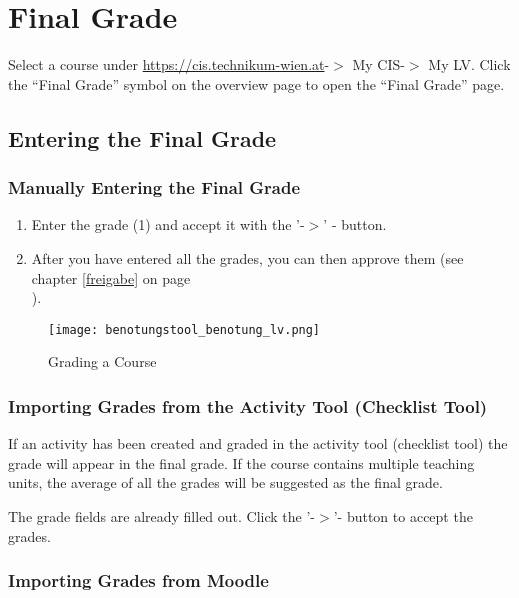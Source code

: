 \section{Final Grade}
\label{gesamtnote}
Select a course under \url{https://cis.technikum-wien.at}-$>$ My CIS-$>$ My LV. Click the "`Final Grade"' symbol on the overview page to open the "`Final Grade"' page.

\subsection{Entering the Final Grade}
\subsubsection{Manually Entering the Final Grade }
\label{ben}

\begin{enumerate}
\item Enter the grade (1) and accept it with the '-$>$' - button.
\item After you have entered all the grades, you can then approve them (see chapter \ref{freigabe} on page \pageref{freigabe}\\).
\end{enumerate}

\begin{figure}[ht]
\begin{center}
\texttt{[image: benotungstool\_benotung\_lv.png]}
\end{center}
\caption{Grading a Course}\label{benotung_lv}
\end{figure}

\subsubsection{Importing Grades from the Activity Tool (Checklist Tool)}
\label{ben}

If an activity has been created and graded in the activity tool (checklist tool) the grade will appear in the final grade.
If the course contains multiple teaching units, the average of all the grades will be suggested as the final grade.

The grade fields are already filled out. Click the '-$>$'- button to accept the grades.

\subsubsection{Importing Grades from Moodle}
\label{ben}

